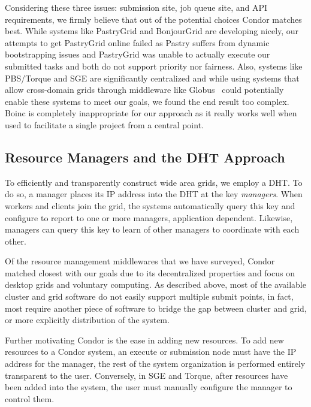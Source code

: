 \documentclass[conference]{IEEEtran}
\begin{document}
\addtocounter{footnote}{1}
\addtocounter{footnote}{1}
\addtocounter{footnote}{1}

Considering these three issues:  submission site, job queue site, and API
requirements, we firmly believe that out of the potential choices Condor
matches best.  While systems like PastryGrid and BonjourGrid are developing
nicely, our attempts to get PastryGrid online failed as Pastry suffers from
dynamic bootstrapping issues and PastryGrid was unable to actually execute our
submitted tasks and both do not support priority nor fairness.  Also, systems
like PBS/Torque and SGE are significantly centralized and while using systems
that allow cross-domain grids through middleware like Globus~\cite{globus}
could potentially enable these systems to meet our goals, we found the end
result too complex.  Boinc is completely inappropriate for our approach as it
really works well when used to facilitate a single project from a central
point.

\subsection{Resource Managers and the DHT Approach}
\label{condor}

To efficiently and transparently construct wide area grids, we employ a DHT.
To do so, a manager places its IP address into the DHT at the key
\emph{managers}.  When workers and clients join the grid, the systems
automatically query this key and configure to report to one or more managers,
application dependent.  Likewise, managers can query this key to learn of other
managers to coordinate with each other.

Of the resource management middlewares that we have surveyed, Condor matched
closest with our goals due to its decentralized properties and focus on desktop
grids and voluntary computing.  As described above, most of the available
cluster and grid software do not easily support multiple submit points, in
fact, most require another piece of software to bridge the gap between cluster
and grid, or more explicitly distribution of the system.

Further motivating Condor is the ease in adding new resources.  To add new
resources to a Condor system, an execute or submission node must have the IP
address for the manager, the rest of the system organization is performed
entirely transparent to the user.  Conversely, in SGE and Torque, after
resources have been added into the system, the user must manually configure the
manager to control them.
\end{document}
